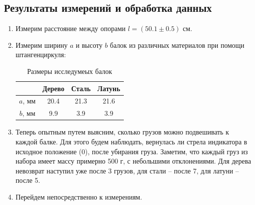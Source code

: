 \documentclass[12pt]{article}
\begin{document}
    \subsection{Результаты измерений и обработка данных}
    \begin{enumerate}
        \item Измерим расстояние между опорами $l = (50.1 \pm 0.5)$ см.
        \item Измерим ширину $a$ и высоту $b$ балок из различных
        материалов при помощи штангенциркуля:
        \begin{table}[H]
            \centering
            \caption{Размеры исследумеых балок}
            \begin{tabular}{|c|c|c|c|}
            \hline
                    & Дерево & Сталь & Латунь \\ \hline
            $a$, мм & 20.4   & 21.3  & 21.6   \\ \hline
            $b$, мм & 9.9    & 3.9   & 3.9    \\ \hline
            \end{tabular}
        \end{table}

        \item Теперь опытным путем выясним, сколько грузов можно подвешивать
        к каждой балке. Для этого будем наблюдать, вернулась ли стрела индикатора
        в исходное положение (0), после убирания груза. Заметим, что каждый груз
        из набора имеет массу примерно 500 г, с небольшими отклонениями.
        Для дерева невозврат наступил уже после 3 грузов, для стали -- после 7,
        для латуни -- после 5.
        \item Перейдем непосредственно к измерениям.

    \end{enumerate}
\end{document}
